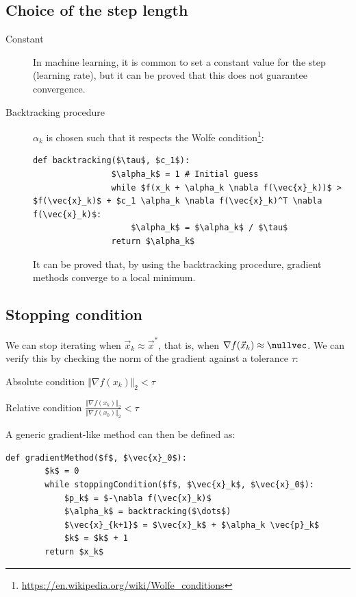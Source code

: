 \subsection{Choice of the step length}
\begin{description}
    \item[Constant] 
        In machine learning, it is common to set a constant value for the step (learning rate), 
        but it can be proved that this does not guarantee convergence.
    
    \item[Backtracking procedure] 
        $\alpha_k$ is chosen such that it respects the Wolfe condition\footnote{\url{https://en.wikipedia.org/wiki/Wolfe_conditions}}:
        \begin{lstlisting}[mathescape=true, belowskip = -0.8\baselineskip]
            def backtracking($\tau$, $c_1$):
                $\alpha_k$ = 1 # Initial guess
                while $f(x_k + \alpha_k \nabla f(\vec{x}_k))$ > $f(\vec{x}_k)$ + $c_1 \alpha_k \nabla f(\vec{x}_k)^T \nabla f(\vec{x}_k)$:
                    $\alpha_k$ = $\alpha_k$ / $\tau$
                return $\alpha_k$
        \end{lstlisting}
        It can be proved that, by using the backtracking procedure, gradient methods converge to a local minimum.
\end{description}


\subsection{Stopping condition}
We can stop iterating when $\vec{x}_k \approx \vec{x}^*$, that is, when $\nabla f(\vec{x}_k) \approx \nullvec$.
We can verify this by checking the norm of the gradient against a tolerance $\tau$:
\begin{descriptionlist}
    \item[Absolute condition] $\Vert \nabla f(x_k) \Vert_2 < \tau$ 
    \item[Relative condition] $\frac{\Vert \nabla f(x_k) \Vert_2}{\Vert \nabla f(x_0) \Vert_2} < \tau$ 
\end{descriptionlist}

A generic gradient-like method can then be defined as:
\begin{lstlisting}[mathescape=true]
    def gradientMethod($f$, $\vec{x}_0$):
        $k$ = 0
        while stoppingCondition($f$, $\vec{x}_k$, $\vec{x}_0$):
            $p_k$ = $-\nabla f(\vec{x}_k)$
            $\alpha_k$ = backtracking($\dots$)
            $\vec{x}_{k+1}$ = $\vec{x}_k$ + $\alpha_k \vec{p}_k$
            $k$ = $k$ + 1
        return $x_k$
\end{lstlisting}


